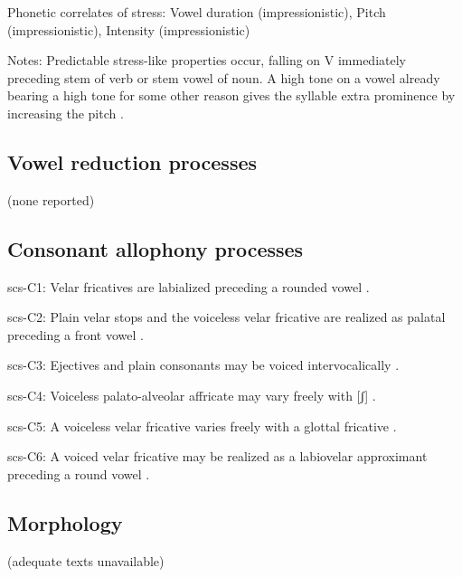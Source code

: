 {\begin{appendixdesc}
\item[Phonetic correlates of stress:] Vowel duration (impressionistic), Pitch (impressionistic), Intensity (impressionistic)

\item[Notes:] Predictable stress-like properties occur, falling on V immediately preceding stem of verb or stem vowel of noun. A high tone on a vowel already bearing a high tone for some other reason gives the syllable extra prominence by increasing the pitch \citep[362]{Rice2005}.
\end{appendixdesc}
\subsection*{Vowel reduction processes}

(none reported)
\subsection*{Consonant allophony processes}
\begin{appendixdesc}

\item[scs-C1:] Velar fricatives are labialized preceding a rounded vowel \citep[31]{Rice1989}.

\item[scs-C2:] Plain velar stops and the voiceless velar fricative are realized as palatal preceding a front vowel \citep[31]{Rice1989}.

\item[scs-C3:] Ejectives and plain consonants may be voiced intervocalically \citep[31]{Rice1989}.

\item[scs-C4:] Voiceless palato-alveolar affricate may vary freely with [ʃ] \citep[35]{Rice1989}.

\item[scs-C5:] A voiceless velar fricative varies freely with a glottal fricative \citep[32]{Rice1989}.

\item[scs-C6:] A voiced velar fricative may be realized as a labiovelar approximant preceding a round vowel \citep[32]{Rice1989}.
\end{appendixdesc}
\subsection*{Morphology}

(adequate texts unavailable)

}
